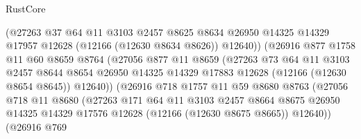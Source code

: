 \begin{lexlean}{RustCore}
\begin{coremodule}
                            (@27263
                              @37
                              @64
                              @11
                              @3103
                              @2457
                              @8625
                              @8634
                              @26950
                              @14325
                              @14329
                              @17957
                              @12628
                              (@12166 (@12630 @8634 @8626))
                              @12640))
                          (@26916
                            @877
                            @1758
                            @11
                            @60
                            @8659
                            @8764
                            (@27056
                              @877
                              @11
                              @8659
                              (@27263
                                @73
                                @64
                                @11
                                @3103
                                @2457
                                @8644
                                @8654
                                @26950
                                @14325
                                @14329
                                @17883
                                @12628
                                (@12166 (@12630 @8654 @8645))
                                @12640))
                            (@26916
                              @718
                              @1757
                              @11
                              @59
                              @8680
                              @8763
                              (@27056
                                @718
                                @11
                                @8680
                                (@27263
                                  @171
                                  @64
                                  @11
                                  @3103
                                  @2457
                                  @8664
                                  @8675
                                  @26950
                                  @14325
                                  @14329
                                  @17576
                                  @12628
                                  (@12166 (@12630 @8675 @8665))
                                  @12640))
                              (@26916
                                @769

\end{coremodule}
\end{lexlean}
